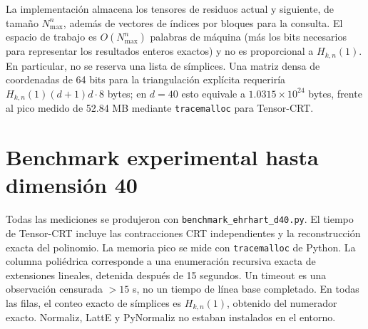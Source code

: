\documentclass[11pt,a4paper]{article}
\begin{document}
La implementación almacena los tensores de residuos actual y siguiente,
de tamaño $N_{\max}^n$, además de vectores de índices por bloques para la
consulta. El espacio de trabajo es $O(N_{\max}^n)$ palabras de máquina
(más los bits necesarios para representar los resultados enteros exactos)
y no es proporcional a $H_{k,n}(1)$. En particular, no se reserva una
lista de símplices. Una matriz densa de coordenadas de 64 bits para la
triangulación explícita requeriría
$H_{k,n}(1)(d+1)d\cdot8$ bytes; en $d=40$ esto equivale a
$1.0315\times10^{24}$ bytes, frente al pico medido de 52.84 MB mediante
\texttt{tracemalloc} para Tensor-CRT.

\section{Benchmark experimental hasta dimensión 40}

Todas las mediciones se produjeron con
\texttt{benchmark\_ehrhart\_d40.py}. El tiempo de Tensor-CRT incluye las
contracciones CRT independientes y la reconstrucción exacta del polinomio.
La memoria pico se mide con \texttt{tracemalloc} de Python. La columna
poliédrica corresponde a una enumeración recursiva exacta de extensiones
lineales, detenida después de 15 segundos. Un timeout es una observación
censurada $>15$ s, no un tiempo de línea base completado. En todas las filas,
el conteo exacto de símplices es $H_{k,n}(1)$, obtenido del numerador
exacto. Normaliz, LattE y PyNormaliz no estaban instalados en el entorno.
\end{document}
